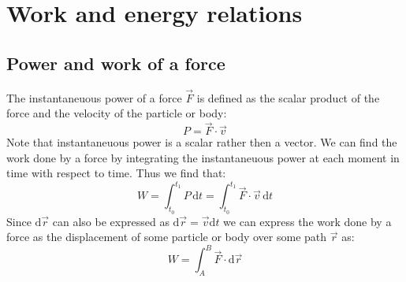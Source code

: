 \documentclass[11pt, a4paper]{article}
\renewcommand*{\d}{\text{d}}
\numberwithin{equation}{section}
\numberwithin{figure}{section}
\begin{document}
\setcounter{section}{3}
\section{Work and energy relations}


\subsection{Power and work of a force}
The instantaneuous power of a force $\vec{F}$ is defined as the scalar product of the force and the velocity of the particle or body:
\begin{equation}
  P = \vec{F}\cdot \vec{v}
\end{equation}
Note that instantaneuous power is a scalar rather then a vector. We can find the work done by a force by integrating the instantaneuous power at each moment in time with respect to time. Thus we find that:
\begin{equation}
  W = \int_{t_0}^{t_1} P\,\d t = \int_{t_0}^{t_1} \vec{F}\cdot\vec{v} \,\d t
\end{equation}
Since $\d\vec{r}$ can also be expressed as $\d\vec{r} = \vec{v}\d t$ we can express the work done by a force as the displacement of some particle or body over some path $\vec{r}$ as:
\begin{equation}
  W = \int_A^B \vec{F}\cdot\d\vec{r}
\end{equation}
\end{document}
